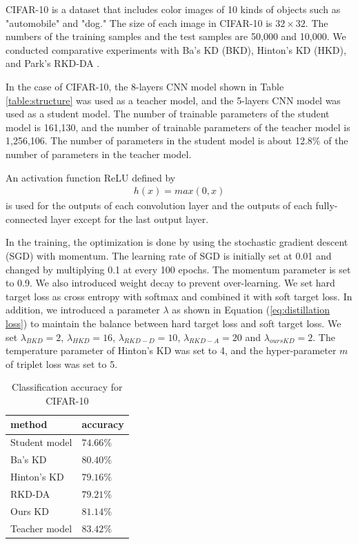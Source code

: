 \documentclass[a4paper,12pt]{article}
\begin{document}
CIFAR-10 is a dataset that includes color images of 10 kinds of objects such as "automobile" and "dog."
The size of each image in CIFAR-10 is $32 \times 32$.
The numbers of the training samples and the test samples are 50,000 and 10,000.
We conducted comparative experiments with Ba's KD \cite{Ba2014} (BKD), Hinton's KD \cite{Hinton2015} (HKD), and Park's RKD-DA \cite{Park2019}.

In the case of CIFAR-10, the 8-layers CNN model shown in Table \ref{table:structure} was used as a teacher model, and the 5-layers CNN model was used as a student model.
The number of trainable parameters of the student model is 161,130, and the number of trainable parameters of the teacher model is 1,256,106. 
The number of parameters in the student model is about 12.8$\%$ of the number of parameters in the teacher model.

An activation function ReLU defined by
\begin{align} \label{eq:ReLU}
h(x) = max(0,x)
\end{align}
is used for the outputs of each convolution layer and the outputs of each fully-connected layer except for the last output layer.

In the training, the optimization is done by using the stochastic gradient descent (SGD) with momentum.
The learning rate of SGD is initially set at 0.01 and changed by multiplying 0.1 at every 100 epochs. 
The momentum parameter is set to 0.9.
We also introduced weight decay to prevent over-learning.
We set hard target loss as cross entropy with softmax and combined it with soft target loss.
In addition, we introduced a parameter $\lambda$ as shown in Equation (\ref{eq:distillation loss}) to maintain the balance between hard target loss and soft target loss.
We set $\lambda_{BKD}=2$, $\lambda_{HKD}=16$, $\lambda_{RKD-D}=10$, $\lambda_{RKD-A}=20$ and $\lambda_{oursKD}=2$.
The temperature parameter of Hinton's KD \cite{Hinton2015} was set to 4, and the hyper-parameter $m$ of triplet loss was set to 5.


\begin{table}[ht]
\caption{Classification accuracy for CIFAR-10}
\label{table:cifar-10}
\begin{center}
\begin{tabular}{|l|l|}
\hline
method & accuracy \\ \hline \hline
Student model & $74.66\%$ \\ \hline
Ba's KD & $80.40\%$ \\ \hline
Hinton's KD & $79.16\%$ \\ \hline
RKD-DA &       $79.21\%$     \\ \hline
Ours KD & $\bm{81.14}\%$ \\ \hline \hline
Teacher model  & $83.42\%$     \\
\hline
\end{tabular}
\end{center}
\end{table}
\end{document}
